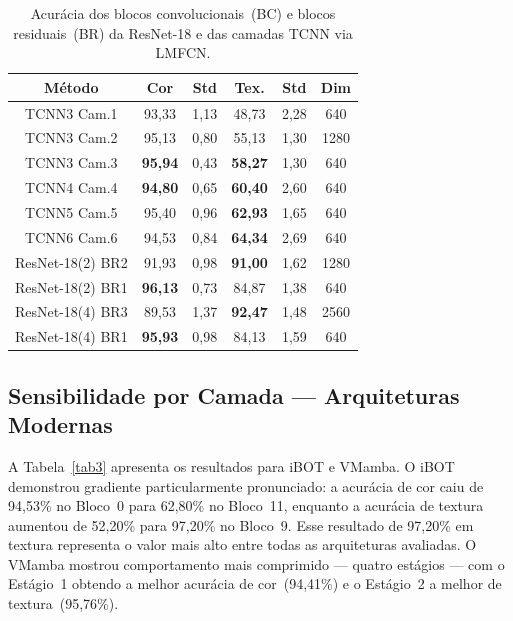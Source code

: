 \documentclass[letterpaper, 10 pt, conference]{ieeeconf}
\begin{document}
\begin{table}[htbp]
\caption{Acurácia dos blocos convolucionais~(BC) e blocos residuais~(BR)
         da ResNet-18 e das camadas TCNN via LMFCN.}
\begin{center}
\begin{tabular}{c|c|c|c|c|c}
\hline
\textbf{Método} & \textbf{Cor} & \textbf{Std}
                & \textbf{Tex.} & \textbf{Std} & \textbf{Dim} \\
\hline
TCNN3 Cam.1 & 93,33 & 1,13 & 48,73 & 2,28 & 640  \\
TCNN3 Cam.2 & 95,13 & 0,80 & 55,13 & 1,30 & 1280 \\
TCNN3 Cam.3 & \textbf{95,94} & 0,43 & \textbf{58,27} & 1,30 & 640 \\
TCNN4 Cam.4 & \textbf{94,80} & 0,65 & \textbf{60,40} & 2,60 & 640 \\
TCNN5 Cam.5 & 95,40 & 0,96 & \textbf{62,93} & 1,65 & 640  \\
TCNN6 Cam.6 & 94,53 & 0,84 & \textbf{64,34} & 2,69 & 640  \\
ResNet-18(2) BR2 & 91,93 & 0,98 & \textbf{91,00} & 1,62 & 1280 \\
ResNet-18(2) BR1 & \textbf{96,13} & 0,73 & 84,87 & 1,38 & 640  \\
ResNet-18(4) BR3 & 89,53 & 1,37 & \textbf{92,47} & 1,48 & 2560 \\
ResNet-18(4) BR1 & \textbf{95,93} & 0,98 & 84,13 & 1,59 & 640  \\
\hline
\end{tabular}
\label{tab1}
\end{center}
\end{table}

\subsection{Sensibilidade por Camada — Arquiteturas Modernas}

A Tabela~\ref{tab3} apresenta os resultados para iBOT e VMamba.
O iBOT demonstrou gradiente particularmente pronunciado: a acurácia de cor
caiu de 94,53\% no Bloco~0 para 62,80\% no Bloco~11, enquanto a acurácia
de textura aumentou de 52,20\% para 97,20\% no Bloco~9.
Esse resultado de 97,20\% em textura representa o valor mais alto entre
todas as arquiteturas avaliadas.
O VMamba mostrou comportamento mais comprimido — quatro estágios — com o
Estágio~1 obtendo a melhor acurácia de cor~(94,41\%) e o Estágio~2
a melhor de textura~(95,76\%).
\end{document}
